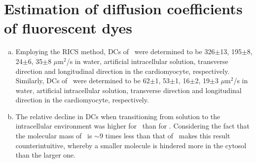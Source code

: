 \section*{Estimation of diffusion coefficients of fluorescent dyes}

\begin{enumerate}[a)]
    \setcounter{enumi}{\value{saveenum}}
\item Employing the \ac{RICS} method, \acp{DC} of \ATP\ were determined to be 326$\pm$13, 195$\pm$8, 24$\pm$6,
35$\pm$8 $\mu$m$^2$/s in water, artificial intracellular solution,
transverse direction and longitudinal direction in the cardiomyocyte,
respectively. Similarly, \acp{DC} of \DEX\ were determined to be 62$\pm$1, 53$\pm$1,
16$\pm$2, 19$\pm$3 $\mu$m$^2$/s in water, artificial intracellular solution,
transverse direction and longitudinal direction in the cardiomyocyte,
respectively. 

\item The relative decline in \acp{DC} when transitioning from solution to the
intracellular environment was higher for \ATP\ than for \DEX.
Considering the fact that the molecular mass of \ATP\ is $\sim$9 times less than
that of \DEX\ makes this result counterintuitive, whereby a
smaller molecule is hindered more in the cytosol than the larger one.
\setcounter{saveenum}{\value{enumi}}
\end{enumerate}



